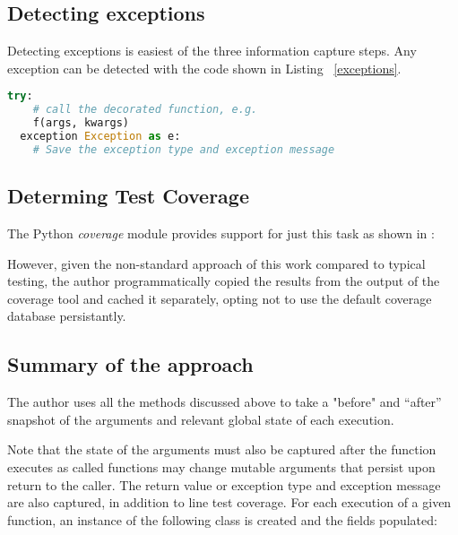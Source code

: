 \subsection{Detecting exceptions}\label{sec:approach-internal-3}
Detecting exceptions is easiest of the three information capture steps.
Any exception can be detected with the code shown in Listing 
~\ref{exceptions}.

\begin{lstlisting}[language=Python, caption={Catching and recording exceptions}, label={exceptions}]
  try:
    # call the decorated function, e.g.
    f(args, kwargs)
  exception Exception as e:
    # Save the exception type and exception message
  \end{lstlisting}

\subsection{Determing Test Coverage}\label{sec:approach-internal-4}
The Python \textit{coverage}
module provides support for just this task as shown in \nameref{}:



However, given the non-standard
approach of this work compared to typical testing, the author programmatically
copied the results from the output of the coverage tool and cached it separately, 
opting not to use the default coverage database persistantly.

\subsection{Summary of the approach}\label{sec:approach-internal-5}

The author uses all the methods discussed above to take a "before" and “after” 
snapshot of the arguments and relevant global state of each execution. 

Note that the state of the arguments must also be captured after the function 
executes as called functions may change mutable arguments that persist upon 
return to the caller. The return value or exception type and exception message
 are also captured, in addition to line test coverage. 
 For each execution of a given function, an instance of the 
 following class is created and the fields populated:

